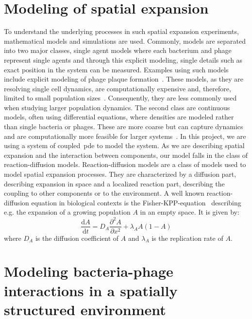 \section{Modeling of spatial expansion}
To understand the underlying processes in such spatial expansion experiments, mathematical models and simulations are used. Commonly, models are separated into two major classes, single agent models where each bacterium and phage represent single agents and through this explicit modeling, single details such as exact position in the system can be measured. Examples using such models include explicit modeling of phage plaque formation~\cite{Valdez2025-io}. These models, as they are resolving single cell dynamics, are computationally expensive and, therefore, limited to small population sizes~\cite{Nagarajan2022-rv}. Consequently, they are less commonly used when studying larger population dynamics. The second class are continuous models, often using differential equations, where densities are modeled rather than single bacteria or phages. These are more coarse but can capture dynamics and are computationally more feasible for larger systems~\cite{Succurro2018-if}. In this project, we are using a system of coupled~\gls{pde} to model the system. As we are describing spatial expansion and the interaction between components, our model falls in the class of reaction-diffusion models. 
Reaction-diffusion models are a class of models used to model spatial expansion processes. They are characterized by a diffusion part, describing expansion in space and a localized reaction part, describing the coupling to other components or to the environment. A well known reaction-diffusion equation in biological contexts is the Fisher-KPP-equation~\cite{Fisher1937-rd} describing e.g. the expansion of a growing population $A$ in an empty space. It is given by:
\begin{equation}
    \frac{\text{d}A}{\text{d}t} = D_A \frac{\partial^2A}{\partial x^2} + \lambda_A A (1-A)
\end{equation}
where $D_A$ is the diffusion coefficient of $A$ and $\lambda_A$ is the replication rate of $A$.

\section{Modeling bacteria-phage interactions in a spatially structured environment}

